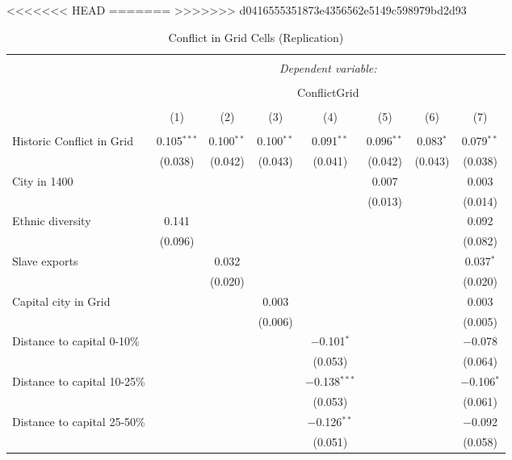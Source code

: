 
<<<<<<< HEAD
=======
>>>>>>> d0416555351873e4356562e5149c598979bd2d93
\begin{table}[!htbp] \centering 
  \caption{Conflict in Grid Cells (Replication)} 
  \label{} 
\footnotesize 
\begin{tabular}{@{\extracolsep{2pt}}lccccccc} 
\\[-1.8ex]\hline 
\hline \\[-1.8ex] 
 & \multicolumn{7}{c}{\textit{Dependent variable:}} \\ 
\cline{2-8} 
\\[-1.8ex] & \multicolumn{7}{c}{ConflictGrid} \\ 
\\[-1.8ex] & (1) & (2) & (3) & (4) & (5) & (6) & (7)\\ 
\hline \\[-1.8ex] 
 Historic Conflict in Grid & 0.105$^{***}$ & 0.100$^{**}$ & 0.100$^{**}$ & 0.091$^{**}$ & 0.096$^{**}$ & 0.083$^{*}$ & 0.079$^{**}$ \\ 
  & (0.038) & (0.042) & (0.043) & (0.041) & (0.042) & (0.043) & (0.038) \\ 
  City in 1400 &  &  &  &  & 0.007 &  & 0.003 \\ 
  &  &  &  &  & (0.013) &  & (0.014) \\ 
  Ethnic diversity & 0.141 &  &  &  &  &  & 0.092 \\ 
  & (0.096) &  &  &  &  &  & (0.082) \\ 
  Slave exports &  & 0.032 &  &  &  &  & 0.037$^{*}$ \\ 
  &  & (0.020) &  &  &  &  & (0.020) \\ 
  Capital city in Grid &  &  & 0.003 &  &  &  & 0.003 \\ 
  &  &  & (0.006) &  &  &  & (0.005) \\ 
  Distance to capital 0-10\% &  &  &  & $-$0.101$^{*}$ &  &  & $-$0.078 \\ 
  &  &  &  & (0.053) &  &  & (0.064) \\ 
  Distance to capital 10-25\% &  &  &  & $-$0.138$^{***}$ &  &  & $-$0.106$^{*}$ \\ 
  &  &  &  & (0.053) &  &  & (0.061) \\ 
  Distance to capital 25-50\% &  &  &  & $-$0.126$^{**}$ &  &  & $-$0.092 \\ 
  &  &  &  & (0.051) &  &  & (0.058) \\ 

\end{tabular}
\end{table}

